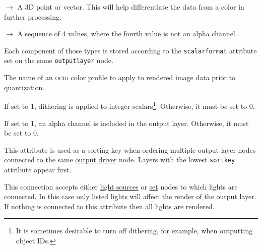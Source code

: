 \documentclass[oneside,ebook]{memoir}
\newcommand*{\acronym}[1]{\textsc{\lowercase{#1}}}
\newcommand{\paramlistitemTN}[2]{\item[#2\textcolor{lightgray}{\dotfill}#1]}
\newcommand{\paramlistitemTND}[3]{\paramlistitemTN{#1 {\rmfamily({\ttfamily#3})}}{#2}}
\newcommand{\paramvalueitem}[1]{\item[#1]$\rightarrow$}
\begin{document}
\begin{paramlist}
\begin{paramvaluelist}
\paramvalueitem{vector}
A 3D point or vector. This will help differentiate the data from a color in further processing.
\paramvalueitem{quad}
A sequence of 4 values, where the fourth value is not an alpha channel.
\end{paramvaluelist}
Each component of those types is stored according to the \lstinline|scalarformat| attribute set on the same \lstinline|outputlayer| node.
\paramlistitemTN{string}{colorprofile}
\index{ocio@\acronym{OCIO}}
The name of an \acronym{OCIO} color profile to apply to rendered image data prior to quantization.
\paramlistitemTND{integer}{dithering}{0}
If set to 1, dithering is applied to integer scalars\footnote{It is sometimes desirable to turn off dithering, for example, when outputting object IDs.}.
Otherwise, it must be set to 0.
\paramlistitemTND{integer}{withalpha}{0}
If set to 1, an alpha channel is included in the output layer. Otherwise, it must be set to 0.
\paramlistitemTN{integer}{sortkey}
This attribute is used as a sorting key when ordering multiple output layer nodes connected to the same \hyperref[section:outputdrivernode]{output driver} node.
Layers with the lowest \lstinline|sortkey| attribute appear first.
\paramlistitemTN{<connection>}{lightset}
This connection accepts either \hyperref[section:specifyinglights]{light sources} or \hyperref[section:setnode]{set} nodes to which lights are connected.
In this case only listed lights will affect the render of the output layer.
If nothing is connected to this attribute then all lights are rendered.


\end{paramlist}
\end{document}
